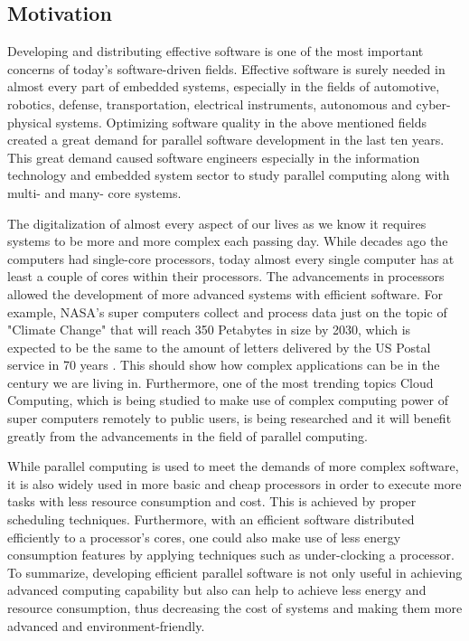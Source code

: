 \subsection{Motivation}
Developing and distributing effective software is one of the most important concerns of today's software-driven fields. Effective software is surely needed in almost every part of embedded systems, especially in the fields of automotive, robotics, defense, transportation, electrical instruments, autonomous and cyber-physical systems. Optimizing software quality in the above mentioned fields created a great demand for parallel software development in the last ten years. This great demand caused software engineers especially in the information technology and embedded system sector to study parallel computing along with multi- and many- core systems.

The digitalization of almost every aspect of our lives as we know it requires systems to be more and more complex each passing day. While decades ago the computers had single-core processors, today almost every single computer has at least a couple of cores within their processors. The advancements in processors allowed the development of more advanced systems with efficient software. For example, NASA's super computers collect and process data just on the topic of "Climate Change" that will reach 350 Petabytes in size by 2030, which is expected to be the same to the amount of letters delivered by the US Postal service in 70 years \cite{nasachallenge}. This should show how complex applications can be in the century we are living in. Furthermore, one of the most trending topics Cloud Computing, which is being studied to make use of complex computing power of super computers remotely to public users, is being researched and it will benefit greatly from the advancements in the field of parallel computing.

While parallel computing is used to meet the demands of more complex software, it is also widely used in more basic and cheap processors in order to execute more tasks with less resource consumption and cost. This is achieved by proper scheduling techniques. Furthermore, with an efficient software distributed efficiently to a processor's cores, one could also make use of less energy consumption features by applying techniques such as under-clocking a processor. To summarize, developing efficient parallel software is not only useful in achieving advanced computing capability but also can help to achieve less energy and resource consumption, thus decreasing the cost of systems and making them more advanced and environment-friendly.

